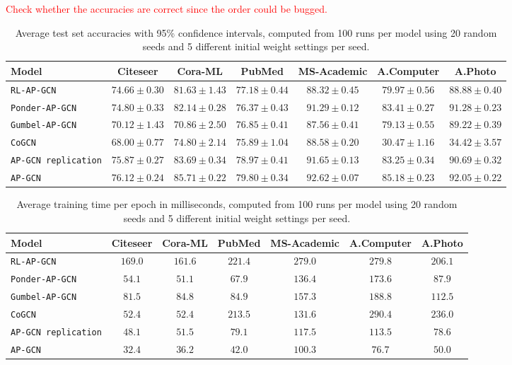 \documentclass{gdl}
\begin{document}
\textcolor{red}{Check whether the accuracies are correct since the order could be bugged.}
\begin{table}[h]
    \small\sf\centering
    \caption{Average test set accuracies with 95\% confidence intervals, computed from 100 runs per model using 20 random seeds and 5 different initial weight settings per seed.}
    \begin{tabular}{l c c c c c c}
        \toprule
        Model & Citeseer & Cora-ML & PubMed & MS-Academic & A.Computer & A.Photo\\
        \midrule
        \texttt{RL-AP-GCN} &$74.66 \pm 0.30$&$81.63 \pm 1.43$&$77.18 \pm 0.44$&$88.32 \pm 0.45$&$79.97 \pm 0.56$&$88.88 \pm 0.40$   \\
        \texttt{Ponder-AP-GCN} &$74.80 \pm 0.33$&$82.14 \pm 0.28$&$76.37 \pm 0.43$&$91.29 \pm 0.12$&$83.41 \pm 0.27$&$91.28 \pm 0.23$  \\
        \texttt{Gumbel-AP-GCN} &$70.12 \pm 1.43$&$70.86 \pm 2.50$&$76.85 \pm 0.41$&$87.56 \pm 0.41$&$79.13 \pm 0.55$&$89.22 \pm 0.39$  \\
        \texttt{CoGCN} &$68.00 \pm 0.77$&$74.80 \pm 2.14$&$75.89 \pm 1.04$&$88.58 \pm 0.20$&$30.47 \pm 1.16$&$34.42 \pm 3.57$  \\
        \texttt{AP-GCN replication} &$75.87 \pm 0.27$&$83.69 \pm 0.34$&$78.97 \pm 0.41$&$91.65 \pm 0.13$&$83.25 \pm 0.34$&$90.69 \pm 0.32$        \\
        \midrule
        \texttt{AP-GCN} & $76.12 \pm 0.24$ & $85.71 \pm 0.22$ & $79.80 \pm 0.34$ & $92.62 \pm 0.07$ & $85.18 \pm 0.23$ & $92.05 \pm 0.22$\\
        \bottomrule
    \end{tabular}
    \label{tab:accuracy}
\end{table}

\begin{table}[h]
    \small\sf\centering
    \caption{Average training time per epoch in milliseconds, computed from 100 runs per model using 20 random seeds and 5 different initial weight settings per seed.}
    \begin{tabular}{l c c c c c c}
        \toprule
        Model & Citeseer & Cora-ML & PubMed & MS-Academic & A.Computer & A.Photo   \\
        \midrule
        \texttt{RL-AP-GCN} &$169.0$&$161.6$&$221.4$&$279.0$&$279.8$&$206.1$  \\
        \texttt{Ponder-AP-GCN} &$54.1$&$51.1$&$67.9$&$136.4$&$173.6$&$87.9$   \\
        \texttt{Gumbel-AP-GCN} &$81.5$&$84.8$&$84.9$&$157.3$&$188.8$&$112.5$   \\
        \texttt{CoGCN} &$52.4$&$52.4$&$213.5$&$131.6$&$290.4$&$236.0$  \\
        \texttt{AP-GCN replication} &$48.1$&$51.5$&$79.1$&$117.5$&$113.5$&$78.6$  \\
        \midrule
        \texttt{AP-GCN} & $32.4$ & $36.2$ & $42.0$ & $100.3$ & $76.7$ & $50.0$ \\
        \bottomrule 
    \end{tabular}
    \label{tab:time-per-epoch}
\end{table}
\end{document}
